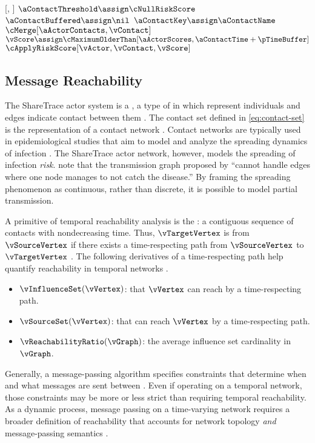 \begin{function}{\nHandleContact}[\vActor, \vContact]
    \State $\aContactThreshold \assign \cNullRiskScore$
    \State $\aContactBuffered \assign \nil$
    \State $\aContactKey \assign \aContactName$
    \State $\cMerge[\aActorContacts, \vContact]$
    \State $\vScore \assign \cMaximumOlderThan[\aActorScores, \aContactTime + \pTimeBuffer]$
    \State $\cApplyRiskScore[\vActor, \vContact, \vScore]$
  \EndIf
\end{function}

\subsection{Message Reachability}\label{sec:reachability}

The ShareTrace actor system is a , a type of  in which \verticesName represent individuals and edges indicate contact between them \citep{Holme2012, Holme2015}. The contact set defined in \cref{eq:contact-set} is the  representation of a contact network \citep{Holme2012}. Contact networks are typically used in epidemiological studies that aim to model and analyze the spreading dynamics of infection \citep{Riolo2001, Danon2011, Lokhov2014, Craft2015, Pastor-Satorras2015, Koher2019, Zino2021}. The ShareTrace actor network, however, models the spreading of infection \emph{risk}. \citet{Holme2012} note that the transmission graph proposed by \citet{Riolo2001} ``cannot handle edges where one node manages to not catch the disease.'' By framing the spreading phenomenon as continuous, rather than discrete, it is possible to model partial transmission.

A primitive of temporal reachability analysis is the : a contiguous sequence of contacts with nondecreasing time. Thus, \vertexName $\vTargetVertex$ is  from \vertexName $\vSourceVertex$ if there exists a time-respecting path from $\vSourceVertex$ to $\vTargetVertex$ \citep{Moody2002}. The following derivatives of a time-respecting path help quantify reachability in temporal networks \citep{Holme2012}.
\begin{itemize}
  \item {} $\vInfluenceSet(\vVertex)$: \verticesName that $\vVertex$ can reach by a time-respecting path.
  \item {} $\vSourceSet(\vVertex)$: \verticesName that can reach $\vVertex$ by a time-respecting path.
  \item {} $\vReachabilityRatio(\vGraph)$: the average influence set cardinality in $\vGraph$.
\end{itemize}
Generally, a message-passing algorithm specifies constraints that determine when and what messages are sent between \verticesName. Even if operating on a temporal network, those constraints may be more or less strict than requiring temporal reachability. As a dynamic process, message passing on a time-varying network requires a broader definition of reachability that accounts for network topology \emph{and} message-passing semantics \citep{Barrat2013}.

